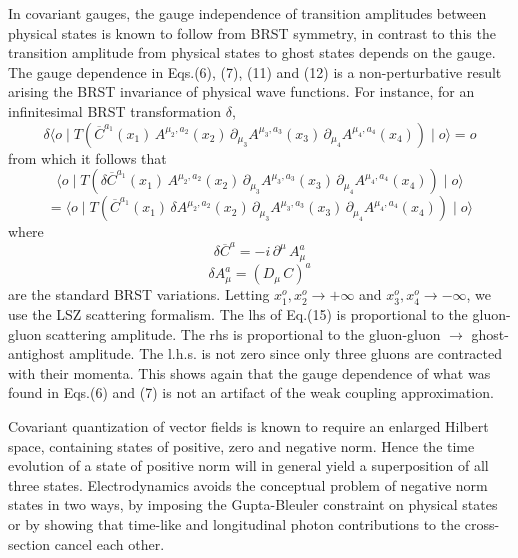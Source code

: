 \documentclass[a4paper,12pt]{article}
\begin{document}
In covariant gauges, the gauge independence of transition amplitudes between physical states is known to follow from BRST symmetry, in contrast to this the transition amplitude from physical states to ghost states depends on the gauge.  The gauge dependence in Eqs.(6), (7), (11) and (12) is a non-perturbative result arising the BRST invariance of physical wave functions.  For instance, for an infinitesimal BRST transformation $\delta$,
\begin{equation}
\delta \langle o \mid T \left(\overline{C}^{a_{1}}(x_{1}) \, A^{\mu_{2},a_{2}}(x_{2}) \, \partial_{\mu_{3}}A^{\mu_{3},a_{3}}(x_{3}) \, \partial_{\mu_{4}}A^{\mu_{4},a_{4}}(x_{4}) \right) \mid o \rangle=o
\end{equation}
from which it follows that
\begin{displaymath}
\langle o \mid T \left( \delta \overline{C}^{a_{1}}(x_{1}) \, A^{\mu_{2},a_{2}}(x_{2}) \, \partial_{\mu_{3}}A^{\mu_{3},a_{3}}(x_{3}) \, \partial_{\mu_{4}}A^{\mu_{4},a_{4}}(x_{4}) \right) \mid o \rangle
\end{displaymath}
\begin{equation}
=\langle o \mid T \left(\overline{C}^{a_{1}}(x_{1}) \, \delta A^{\mu_{2},a_{2}}(x_{2}) \, \partial_{\mu_{3}}A^{\mu_{3},a_{3}}(x_{3}) \, \partial_{\mu_{4}}A^{\mu_{4},a_{4}}(x_{4})\right) \mid o \rangle
\end{equation}
where
\begin{displaymath}
\delta \overline{C}^{a} = - {i} \, \partial^{\mu} \, A^{a}_{\mu}
\end{displaymath}
\begin{equation}
\delta A^{a}_{\mu} = \left(D_{\mu} \, C \right)^{a}
\end{equation}
are the standard BRST variations. Letting $x^{o}_{1} , x^{o}_{2} \rightarrow +\infty$ and $x^{o}_{3}, x^{o}_{4} \rightarrow - \infty$,
we use the LSZ scattering formalism.  The lhs of Eq.(15) is proportional to the gluon-gluon scattering amplitude.  The rhs is proportional to the gluon-gluon $\rightarrow$ ghost-antighost amplitude.  The l.h.s. is not zero since only three gluons are contracted with their momenta.  This shows again that the gauge dependence of what was found in Eqs.(6) and (7) is not an artifact of the weak coupling approximation.

Covariant quantization of vector fields is known to require an enlarged Hilbert space, containing states of positive, zero and negative norm\cite{mss}. Hence the time evolution of a state of positive norm will in general yield a superposition of all three states.  Electrodynamics avoids the conceptual problem of negative norm states in two ways, by imposing the Gupta-Bleuler constraint on physical states or by showing that time-like and longitudinal photon contributions to the cross-section cancel each other.
\end{document}
